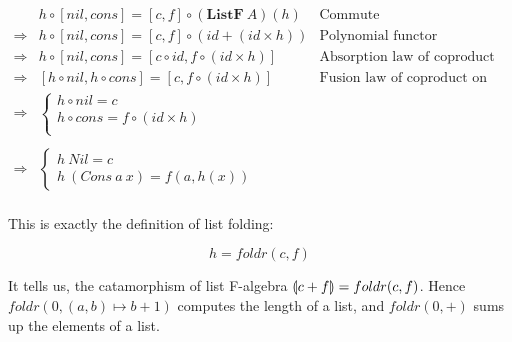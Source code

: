 \documentclass{article}
\begin{document}
\begin{example}
\[
\begin{array}{rll}
            & h \circ [nil, cons] = [c, f] \circ (\mathbf{ListF}\ A)(h) & \text{Commute} \\
\Rightarrow & h \circ [nil, cons] = [c, f] \circ (id + (id \times h)) & \text{Polynomial functor} \\
\Rightarrow & h \circ [nil, cons] = [c \circ id, f \circ (id \times h)] & \text{Absorption law of coproduct on the right} \\
\Rightarrow & [h \circ nil, h \circ cons] = [c, f \circ (id \times h)] & \text{Fusion law of coproduct on the left} \\
\Rightarrow &
  \begin{cases}
    h \circ nil = c \\
    h \circ cons = f \circ (id \times h) \\
  \end{cases} & \\
\\
\Rightarrow &
  \begin{cases}
    h\ Nil = c \\
    h\ (Cons\ a\ x) = f(a, h(x))
  \end{cases} & \\
\end{array}
\]

This is exactly the definition of list folding:

\[
  h = foldr(c, f)
\]

It tells us, the catamorphism of list F-algebra $\llparenthesis c + f \rrparenthesis = foldr(c, f)$. Hence $foldr(0, (a, b) \mapsto b + 1)$ computes the length of a list, and $foldr(0, +)$ sums up the elements of a list.
\end{example}
\end{document}
